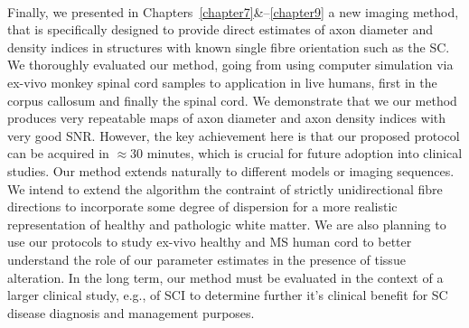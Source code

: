 \paragraph{}
Finally, we presented in Chapters~\ref{chapter7}\&--\ref{chapter9} a new imaging method, that is specifically designed to provide direct estimates of axon diameter and density indices in structures with known single fibre orientation such as the {\gls{SC}}. We thoroughly evaluated our method, going from using computer simulation via ex-vivo monkey spinal cord samples to application in live humans, first in the corpus callosum and finally the spinal cord. We demonstrate that we our method produces very repeatable maps of axon diameter and axon density indices with very good SNR. However, the key achievement here is that our proposed protocol can be acquired in $\approx$30 minutes, which is crucial for future adoption into clinical studies. Our method extends naturally to different models or imaging sequences. We intend to extend the algorithm the contraint of strictly unidirectional fibre directions to incorporate some degree of dispersion for a more realistic representation of healthy and pathologic white matter. We are also planning to use our protocols to study ex-vivo healthy and MS human cord to better understand the role of our parameter estimates in the presence of tissue alteration. In the long term, our method must be evaluated in the context of a larger clinical study, e.g., of \gls{SCI} to determine further it's clinical benefit for \gls{SC} disease diagnosis and management purposes. 
